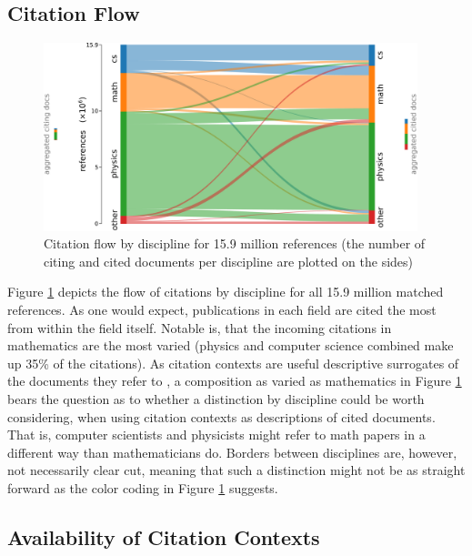 \subsection{Citation Flow}

\begin{figure}
  \centering
    \includegraphics[width=0.97\textwidth]{figures/corpus/Fig7.pdf}
  \caption[Citation flow by discipline for 15.9 million references]{Citation flow by discipline for 15.9 million references (the number of citing and cited documents per discipline are plotted on the sides)}
  \label{fig:sankey}
\end{figure}

Figure \ref{fig:sankey} depicts the flow of citations by discipline for all 15.9 million matched references. As one would expect, publications in each field are cited the most from within the field itself. Notable is, that the incoming citations in mathematics are the most varied (physics and computer science combined make up 35\% of the citations). As citation contexts are useful descriptive surrogates of the documents they refer to \cite{Elkiss2008}, a composition as varied as mathematics in Figure \ref{fig:sankey} bears the question as to whether a distinction by discipline could be worth considering, when using citation contexts as descriptions of cited documents. That is, computer scientists and physicists might refer to math papers in a different way than mathematicians do. Borders between disciplines are, however, not necessarily clear cut, meaning that such a distinction might not be as straight forward as the color coding in Figure \ref{fig:sankey} suggests.

\subsection{Availability of Citation Contexts}

